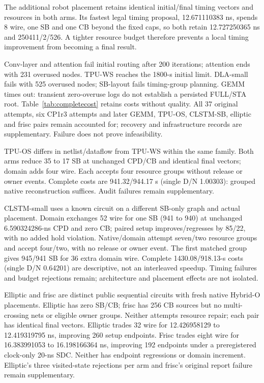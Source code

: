 \documentclass[conference,10pt]{IEEEtran}
\begin{document}
The additional robot placement retains identical initial/final timing vectors and resources in both arms. Its fastest legal timing proposal, 12.671110383 ns, spends 8 wire, one SB and one CB beyond the fixed caps, so both retain 12.727250365 ns and 250411/2/526. A tighter resource budget therefore prevents a local timing improvement from becoming a final result.

Conv-layer and attention fail initial routing after 200 iterations; attention ends with 231 overused nodes. TPU-WS reaches the 1800-s initial limit. DLA-small fails with 525 overused nodes; SB-layout fails timing-group planning. GEMM times out: transient zero-overuse logs do not establish a persisted FULL/STA root. Table~\ref{tab:completecost} retains costs without quality. All 37 original attempts, six CP1r3 attempts and later GEMM, TPU-OS, CLSTM-SB, elliptic and frisc pairs remain accounted for; recovery and infrastructure records are supplementary. Failure does not prove infeasibility.

TPU-OS differs in netlist/dataflow from TPU-WS within the same family. Both arms reduce 35 to 17 SB at unchanged CPD/CB and identical final vectors; domain adds four wire. Each accepts four resource groups without release or owner events. Complete costs are 941.32/944.17 s (single D/N 1.00303): grouped native reconstruction suffices. Audit failures remain supplementary.

CLSTM-small uses a known circuit on a different SB-only graph and actual placement. Domain exchanges 52 wire for one SB (941 to 940) at unchanged 6.590324286-ns CPD and zero CB; paired setup improves/regresses by 85/22, with no added hold violation. Native/domain attempt seven/two resource groups and accept four/two, with no release or owner event. The first matched group gives 945/941 SB for 36 extra domain wire. Complete 1430.08/918.13-s costs (single D/N 0.64201) are descriptive, not an interleaved speedup. Timing failures and budget rejections remain; architecture and placement effects are not isolated.

Elliptic and frisc are distinct public sequential circuits with fresh native Hybrid-O placements. Elliptic has zero SB/CB; frisc has 256 CB sources but no multi-crossing nets or eligible owner groups. Neither attempts resource repair; each pair has identical final vectors. Elliptic trades 32 wire for 12.426958129 to 12.419319795 ns, improving 260 setup endpoints. Frisc trades eight wire for 16.383991053 to 16.198166364 ns, improving 192 endpoints under a preregistered clock-only 20-ns SDC. Neither has endpoint regressions or domain increment. Elliptic's three visited-state rejections per arm and frisc's original report failure remain supplementary.
\end{document}
